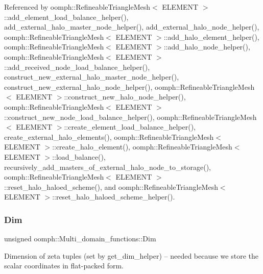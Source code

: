 Referenced by oomph\+::\+Refineable\+Triangle\+Mesh$<$ E\+L\+E\+M\+E\+N\+T $>$\+::add\+\_\+element\+\_\+load\+\_\+balance\+\_\+helper(), add\+\_\+external\+\_\+halo\+\_\+master\+\_\+node\+\_\+helper(), add\+\_\+external\+\_\+halo\+\_\+node\+\_\+helper(), oomph\+::\+Refineable\+Triangle\+Mesh$<$ E\+L\+E\+M\+E\+N\+T $>$\+::add\+\_\+halo\+\_\+element\+\_\+helper(), oomph\+::\+Refineable\+Triangle\+Mesh$<$ E\+L\+E\+M\+E\+N\+T $>$\+::add\+\_\+halo\+\_\+node\+\_\+helper(), oomph\+::\+Refineable\+Triangle\+Mesh$<$ E\+L\+E\+M\+E\+N\+T $>$\+::add\+\_\+received\+\_\+node\+\_\+load\+\_\+balance\+\_\+helper(), construct\+\_\+new\+\_\+external\+\_\+halo\+\_\+master\+\_\+node\+\_\+helper(), construct\+\_\+new\+\_\+external\+\_\+halo\+\_\+node\+\_\+helper(), oomph\+::\+Refineable\+Triangle\+Mesh$<$ E\+L\+E\+M\+E\+N\+T $>$\+::construct\+\_\+new\+\_\+halo\+\_\+node\+\_\+helper(), oomph\+::\+Refineable\+Triangle\+Mesh$<$ E\+L\+E\+M\+E\+N\+T $>$\+::construct\+\_\+new\+\_\+node\+\_\+load\+\_\+balance\+\_\+helper(), oomph\+::\+Refineable\+Triangle\+Mesh$<$ E\+L\+E\+M\+E\+N\+T $>$\+::create\+\_\+element\+\_\+load\+\_\+balance\+\_\+helper(), create\+\_\+external\+\_\+halo\+\_\+elements(), oomph\+::\+Refineable\+Triangle\+Mesh$<$ E\+L\+E\+M\+E\+N\+T $>$\+::create\+\_\+halo\+\_\+element(), oomph\+::\+Refineable\+Triangle\+Mesh$<$ E\+L\+E\+M\+E\+N\+T $>$\+::load\+\_\+balance(), recursively\+\_\+add\+\_\+masters\+\_\+of\+\_\+external\+\_\+halo\+\_\+node\+\_\+to\+\_\+storage(), oomph\+::\+Refineable\+Triangle\+Mesh$<$ E\+L\+E\+M\+E\+N\+T $>$\+::reset\+\_\+halo\+\_\+haloed\+\_\+scheme(), and oomph\+::\+Refineable\+Triangle\+Mesh$<$ E\+L\+E\+M\+E\+N\+T $>$\+::reset\+\_\+halo\+\_\+haloed\+\_\+scheme\+\_\+helper().

\mbox{\label{namespaceoomph_1_1Multi__domain__functions_a27cbb5ec7f6fea2f237c11659ffeef58}} 
\subsubsection{\texorpdfstring{Dim}{Dim}}
{\footnotesize\ttfamily unsigned oomph\+::\+Multi\+\_\+domain\+\_\+functions\+::\+Dim}



Dimension of zeta tuples (set by get\+\_\+dim\+\_\+helper) -- needed because we store the scalar coordinates in flat-\/packed form. 



